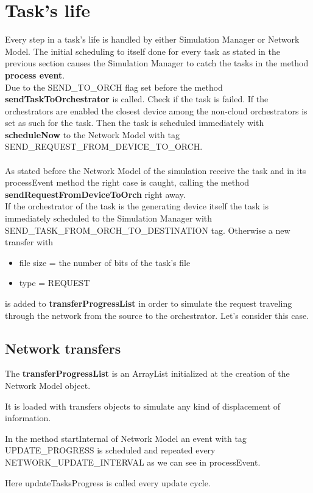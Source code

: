 \documentclass[12pt]{report}
\begin{document}
\section{Task's life}
Every step in a task's life is handled by either Simulation Manager or Network Model.
The initial scheduling to itself done for every task as stated in the previous section causes the Simulation Manager to catch the tasks in the method \textbf{process event}.\\
Due to the SEND\_TO\_ORCH flag set before the method \textbf{sendTaskToOrchestrator} is called.
Check if the task is failed.
If the orchestrators are enabled the closest device among the non-cloud orchestrators is set as such for the task.
Then the task is scheduled immediately with \textbf{scheduleNow} to the Network Model with tag SEND\_REQUEST\_FROM\_DEVICE\_TO\_ORCH.\\
\\
As stated before the Network Model of the simulation receive the task and in its processEvent method the right case is caught, calling the method \textbf{sendRequestFromDeviceToOrch} right away.\\
If the orchestrator of the task is the generating device itself 
the task is immediately scheduled to the Simulation Manager with SEND\_TASK\_FROM\_ORCH\_TO\_DESTINATION tag.
Otherwise a new transfer with
\begin{itemize}
	\item file size = the number of bits of the task's file
	\item type = REQUEST
\end{itemize}
is added to \textbf{transferProgressList} in order to simulate the request traveling through the network from the source to the orchestrator. Let's consider this case.\\

\subsection*{Network transfers}
The \textbf{transferProgressList} is an ArrayList initialized at the creation of the Network Model object.

It is loaded with transfers objects to simulate any kind of displacement of information.

In the method startInternal of Network Model an event with tag UPDATE\_PROGRESS is scheduled and repeated every NETWORK\_UPDATE\_INTERVAL as we can see in processEvent.

Here updateTasksProgress is called every update cycle.
\end{document}

